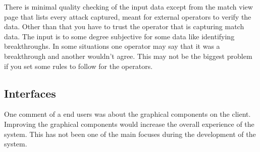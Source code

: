 There is minimal quality checking of the input data except from the match view page that lists every attack captured, meant for external operators to verify the data. Other than that you have to trust the operator that is capturing match data. The input is to some degree subjective for some data like identifying breakthroughs. In some situations one operator may say that it was a breakthrough and another wouldn't agree. This may not be the biggest problem if you set some rules to follow for the operators.

\subsection{Interfaces}

One comment of a end users was about the graphical components on the client. Improving the graphical components would increase the overall experience of the system. This has not been one of the main focuses during the development of the system.